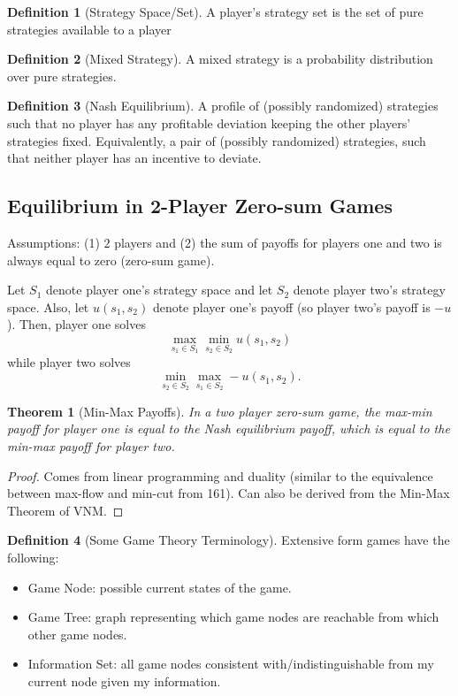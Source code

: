 \documentclass[dvipsnames]{article}
\newtheorem{theorem}{Theorem}[section]
\theoremstyle{definition}
\newtheorem{definition}{Definition}[section]
\theoremstyle{remark}
\begin{document}
\begin{definition}[Strategy Space/Set]
	A player's strategy set is the set of pure strategies available to a player
\end{definition}
	
\begin{definition}[Mixed Strategy]
	A mixed strategy is a probability distribution over pure strategies. 
\end{definition}

\begin{definition}[Nash Equilibrium]
	A profile of (possibly randomized) strategies such that no player has any profitable deviation keeping the other players' strategies fixed.
	Equivalently, a pair of (possibly randomized) strategies, such that neither player has an incentive to deviate.
\end{definition}

\subsection{Equilibrium in 2-Player Zero-sum Games}

Assumptions: (1) $2$ players and (2) the sum of payoffs for players one and two is always equal to zero (zero-sum game).

Let $S_1$ denote player one's strategy space and let $S_2$ denote player two's strategy space. Also, let $u(s_1,s_2)$ denote player one's payoff (so player two's payoff is $-u$). Then, player one solves
$$\max_{s_1 \in S_1} \min_{s_2 \in S_2} u(s_1,s_2)$$
while player two solves
$$\min_{s_2 \in S_2} \max_{s_1 \in S_2} -u(s_1,s_2).$$

\begin{theorem}[Min-Max Payoffs]
	In a two player zero-sum game, the max-min payoff for player one is equal to the Nash equilibrium payoff, which is equal to the min-max payoff for player two.
\end{theorem}

\begin{proof}
	Comes from linear programming and duality (similar to the equivalence between max-flow and min-cut from 161). Can also be derived from the Min-Max Theorem of VNM.
\end{proof}

\begin{definition}[Some Game Theory Terminology]
	Extensive form games have the following:
	\begin{itemize}
		\item Game Node: possible current states of the game.
		\item Game Tree: graph representing which game nodes are reachable from which other game nodes. 
		\item Information Set: all game nodes consistent with/indistinguishable from my current node given my information.
	\end{itemize}
\end{definition}
\end{document}

